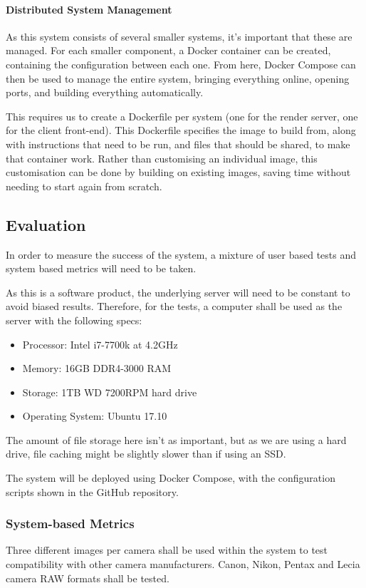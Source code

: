 \documentclass[12pt,a4paper]{article}
\begin{document}
\paragraph{Distributed System Management}
As this system consists of several smaller systems, it's important that these are
managed. For each smaller component, a Docker container can be created, containing the
configuration between each one. From here, Docker Compose can then be used to manage
the entire system, bringing everything online, opening ports, and building everything
automatically.

This requires us to create a Dockerfile per system (one for the render server,
one for the client front-end). This Dockerfile specifies the image to build from,
along with instructions that need to be run, and files that should be shared, to make
that container work. Rather than customising an individual image, this customisation can be done
by building on existing images, saving time without needing to start again from scratch. \cite{DockerWhyItsUseful}

\subsection{Evaluation}
In order to measure the success of the system, a mixture of user based tests and system
based metrics will need to be taken.

As this is a software product, the underlying server will need to be constant to avoid
biased results. Therefore, for the tests, a computer shall be used as the server with the
following specs:

\begin{itemize}
  \item Processor: Intel i7-7700k at 4.2GHz
  \item Memory: 16GB DDR4-3000 RAM
  \item Storage: 1TB WD 7200RPM hard drive
  \item Operating System: Ubuntu 17.10
\end{itemize}

The amount of file storage here isn't as important, but as we are using a hard drive,
file caching might be slightly slower than if using an SSD.

The system will be deployed using Docker Compose, with the configuration scripts shown in the GitHub
repository.

\subsubsection{System-based Metrics}
Three different images per camera shall be used within the system to test compatibility
with other camera manufacturers. Canon, Nikon, Pentax and Lecia camera RAW formats shall be tested.
\end{document}
